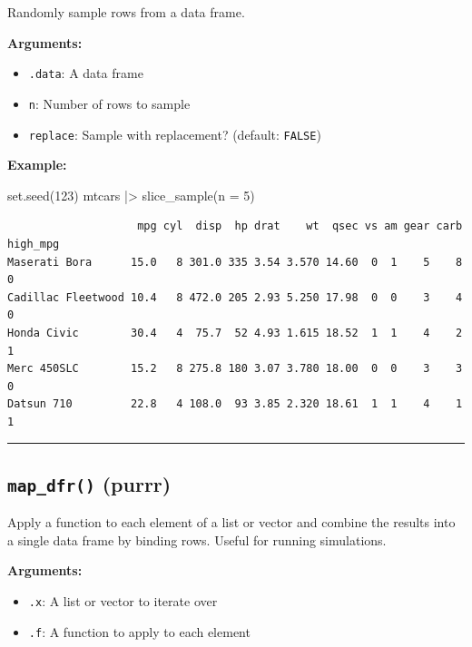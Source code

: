 \documentclass[
  letterpaper,
  DIV=11,
  numbers=noendperiod]{scrreprt}
\newenvironment{Shaded}{\begin{snugshade}}{\end{snugshade}}
\newcommand{\AttributeTok}[1]{\textcolor[rgb]{0.40,0.45,0.13}{#1}}
\newcommand{\DecValTok}[1]{\textcolor[rgb]{0.68,0.00,0.00}{#1}}
\newcommand{\FunctionTok}[1]{\textcolor[rgb]{0.28,0.35,0.67}{#1}}
\newcommand{\NormalTok}[1]{\textcolor[rgb]{0.00,0.23,0.31}{#1}}
\newcommand{\SpecialCharTok}[1]{\textcolor[rgb]{0.37,0.37,0.37}{#1}}
\providecommand{\tightlist}{%
  \setlength{\itemsep}{0pt}\setlength{\parskip}{0pt}}
\begin{document}
Randomly sample rows from a data frame.

\textbf{Arguments:}

\begin{itemize}
\tightlist
\item
  \texttt{.data}: A data frame
\item
  \texttt{n}: Number of rows to sample
\item
  \texttt{replace}: Sample with replacement? (default: \texttt{FALSE})
\end{itemize}

\textbf{Example:}

\begin{Shaded}
\begin{Highlighting}[]
\FunctionTok{set.seed}\NormalTok{(}\DecValTok{123}\NormalTok{)}
\NormalTok{mtcars }\SpecialCharTok{|\textgreater{}}
  \FunctionTok{slice\_sample}\NormalTok{(}\AttributeTok{n =} \DecValTok{5}\NormalTok{)}
\end{Highlighting}
\end{Shaded}

\begin{verbatim}
                    mpg cyl  disp  hp drat    wt  qsec vs am gear carb high_mpg
Maserati Bora      15.0   8 301.0 335 3.54 3.570 14.60  0  1    5    8        0
Cadillac Fleetwood 10.4   8 472.0 205 2.93 5.250 17.98  0  0    3    4        0
Honda Civic        30.4   4  75.7  52 4.93 1.615 18.52  1  1    4    2        1
Merc 450SLC        15.2   8 275.8 180 3.07 3.780 18.00  0  0    3    3        0
Datsun 710         22.8   4 108.0  93 3.85 2.320 18.61  1  1    4    1        1
\end{verbatim}

\begin{center}\rule{0.5\linewidth}{0.5pt}\end{center}

\subsection{\texorpdfstring{\texttt{map\_dfr()}
(purrr)}{map\_dfr() (purrr)}}\label{map_dfr-purrr}

Apply a function to each element of a list or vector and combine the
results into a single data frame by binding rows. Useful for running
simulations.

\textbf{Arguments:}

\begin{itemize}
\tightlist
\item
  \texttt{.x}: A list or vector to iterate over
\item
  \texttt{.f}: A function to apply to each element
\end{itemize}
\end{document}
